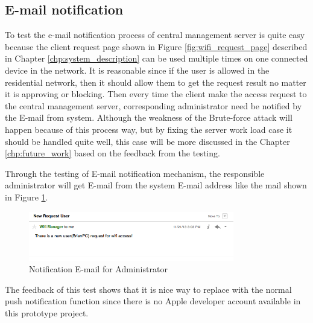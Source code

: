 \subsection{E-mail notification}
\par To test the e-mail notification process of central management server is quite easy because the client request page shown in Figure \ref{fig:wifi_request_page} described in Chapter \ref{chp:system_description} can be used multiple times on one connected device in the network. It is reasonable since if the user is allowed in the residential network, then it should allow them to get the request result no matter it is approving or blocking. Then every time the client make the access request to the central management server, corresponding administrator need be notified by the E-mail from system. Although the weakness of the Brute-force attack will happen because of this process way, but by fixing the server work load case it should be handled quite well, this case will be more discussed in the Chapter \ref{chp:future_work} based on the feedback from the testing.
\par Through the testing of E-mail notification mechanism, the responsible administrator will get E-mail from the system E-mail address like the mail shown in Figure \ref{fig:request_note_mail}.
\begin{figure}
	\centering
    	\includegraphics[width=0.80\textwidth,natwidth=610,natheight=642]{figs/request_note_mail.png}
  	\caption{Notification E-mail for Administrator}
  	\label{fig:request_note_mail}
\end{figure}
\par The feedback of this test shows that it is nice way to replace with the normal push notification function since there is no Apple developer account available in this prototype project.

